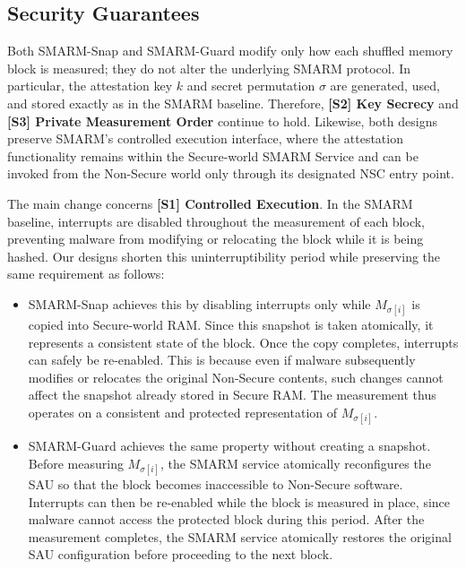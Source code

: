 \documentclass[conference]{IEEEtran}
\newcommand{\smarmcopy}{SMARM-Snap\xspace}
\newcommand{\smarmlock}{SMARM-Guard\xspace}
\begin{document}
\subsection{Security Guarantees}
\label{sec:security_summary}

Both \smarmcopy and \smarmlock modify only how each shuffled memory block is measured; they do not alter the underlying SMARM protocol. In particular, the attestation key $k$ and secret permutation $\sigma$ are generated, used, and stored exactly as in the SMARM baseline. Therefore, \textbf{[S2] Key Secrecy} and \textbf{[S3] Private Measurement Order} continue to hold. 
Likewise, both designs preserve SMARM's controlled execution interface, where the attestation functionality remains within the Secure-world SMARM Service and can be invoked from the Non-Secure world only through its designated NSC entry point.

The main change concerns \textbf{[S1] Controlled Execution}. In the SMARM baseline, interrupts are disabled throughout the measurement of each block, preventing malware from modifying or relocating the block while it is being hashed.
Our designs shorten this uninterruptibility period while preserving the same requirement as follows:

\begin{itemize}
    \item \smarmcopy achieves this by disabling interrupts only while $M_{\sigma[i]}$ is copied into Secure-world RAM. Since this snapshot is taken atomically, it represents a consistent state of the block. Once the copy completes, interrupts can safely be re-enabled.
    This is because even if malware subsequently modifies or relocates the original Non-Secure contents, such changes cannot affect the snapshot already stored in Secure RAM. The measurement thus operates on a consistent and protected representation of $M_{\sigma[i]}$.

    \item \smarmlock achieves the same property without creating a snapshot. Before measuring $M_{\sigma[i]}$, the SMARM service atomically reconfigures the SAU so that the block becomes inaccessible to Non-Secure software. Interrupts can then be re-enabled while the block is measured in place, since malware cannot access the protected block during this period. After the measurement completes, the SMARM service atomically restores the original SAU configuration before proceeding to the next block.
\end{itemize}
\end{document}
